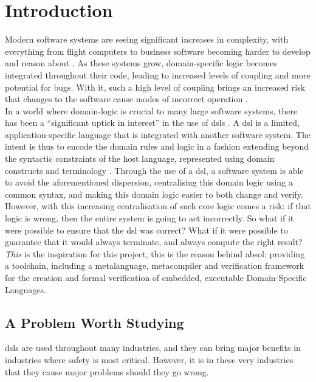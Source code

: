 \chapter{Introduction} %
\label{cha:introduction}
Modern software systems are seeing significant increases in complexity, with everything from flight computers to business software becoming harder to develop and reason about \citep{dvorak2009nasa}.
As these systems grow, domain-specific logic becomes integrated throughout their code, leading to increased levels of coupling and more potential for bugs.
With it, such a high level of coupling brings an increased risk that changes to the software cause modes of incorrect operation \citep{khawar2001developing}.\\

In a world where domain-logic is crucial to many large software systems, there has been a ``significant uptick in interest'' in the use of \glspl{dsl} \citep{fowler2010domain}.
A \gls{dsl} is a limited, application-specific language that is integrated with another software system.
The intent is thus to encode the domain rules and logic in a fashion extending beyond the syntactic constraints of the host language, represented using domain constructs and terminology \citep{Mernik:2005:DDL:1118890.1118892}.
Through the use of a \gls{dsl}, a software system is able to avoid the aforementioned dispersion, centralising this domain logic using a common syntax, and making this domain logic easier to both change and verify.\\

However, with this increasing centralisation of such core logic comes a risk: if that logic is wrong, then the entire system is going to act incorrectly.
So what if it were possible to ensure that the \gls{dsl} was correct?
What if it were possible to guarantee that it would always terminate, and always compute the right result?
\textit{This} is the inspiration for this project, this is the reason behind \gls{absol}: providing a toolchain, including a \gls{metalanguage}, \gls{metacompiler} and verification framework for the creation and formal verification of embedded, executable Domain-Specific Languages.

\section{A Problem Worth Studying} %
\label{sec:a_problem_worth_studying}
\glspl{dsl} are used throughout many industries, and they can bring major benefits in industries where safety is most critical.
However, it is in these very industries that they cause major problems should they go wrong.\\

